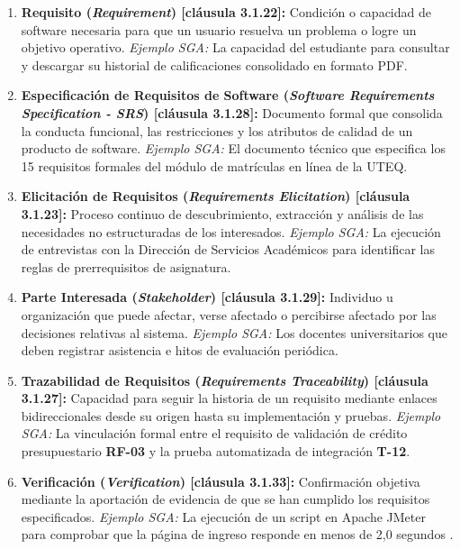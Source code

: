 \documentclass[conference]{IEEEtran}
\begin{document}
	\begin{enumerate}
		\item \textbf{Requisito (\emph{Requirement}) [cláusula 3.1.22]:} Condición o capacidad de software necesaria para que un usuario resuelva un problema o logre un objetivo operativo.  
		\emph{Ejemplo SGA:} La capacidad del estudiante para consultar y descargar su historial de calificaciones consolidado en formato PDF.
		
		\item \textbf{Especificación de Requisitos de Software (\emph{Software Requirements Specification - SRS}) [cláusula 3.1.28]:} Documento formal que consolida la conducta funcional, las restricciones y los atributos de calidad de un producto de software.  
		\emph{Ejemplo SGA:} El documento técnico que especifica los 15 requisitos formales del módulo de matrículas en línea de la UTEQ.
		
		\item \textbf{Elicitación de Requisitos (\emph{Requirements Elicitation}) [cláusula 3.1.23]:} Proceso continuo de descubrimiento, extracción y análisis de las necesidades no estructuradas de los interesados.  
		\emph{Ejemplo SGA:} La ejecución de entrevistas con la Dirección de Servicios Académicos para identificar las reglas de prerrequisitos de asignatura.
		
		\item \textbf{Parte Interesada (\emph{Stakeholder}) [cláusula 3.1.29]:} Individuo u organización que puede afectar, verse afectado o percibirse afectado por las decisiones relativas al sistema.  
		\emph{Ejemplo SGA:} Los docentes universitarios que deben registrar asistencia e hitos de evaluación periódica.
		
		\item \textbf{Trazabilidad de Requisitos (\emph{Requirements Traceability}) [cláusula 3.1.27]:} Capacidad para seguir la historia de un requisito mediante enlaces bidireccionales desde su origen hasta su implementación y pruebas.  
		\emph{Ejemplo SGA:} La vinculación formal entre el requisito de validación de crédito presupuestario \textbf{RF-03} y la prueba automatizada de integración \textbf{T-12}.
		
		\item \textbf{Verificación (\emph{Verification}) [cláusula 3.1.33]:} Confirmación objetiva mediante la aportación de evidencia de que se han cumplido los requisitos especificados.  
		\emph{Ejemplo SGA:} La ejecución de un script en Apache JMeter para comprobar que la página de ingreso responde en menos de 2,0 segundos \cite{jmeter}.
		

\end{enumerate}
\end{document}
